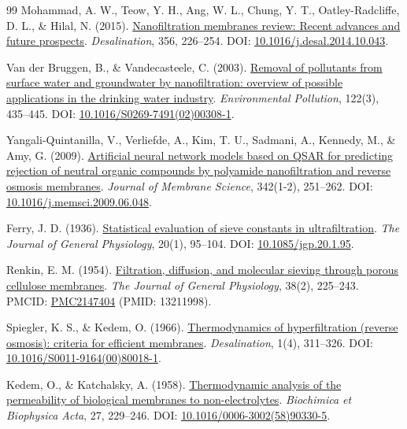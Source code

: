 \documentclass[11pt]{article}
\begin{document}
\begin{thebibliography}{99}
 Mohammad, A. W., Teow, Y. H., Ang, W. L., Chung, Y. T., Oatley-Radcliffe, D. L., \& Hilal, N. (2015). \href{https://doi.org/10.1016/j.desal.2014.10.043}{Nanofiltration membranes review: Recent advances and future prospects}. \textit{Desalination}, 356, 226--254. DOI: \href{https://doi.org/10.1016/j.desal.2014.10.043}{10.1016/j.desal.2014.10.043}.

 Van der Bruggen, B., \& Vandecasteele, C. (2003). \href{https://doi.org/10.1016/S0269-7491(02)00308-1}{Removal of pollutants from surface water and groundwater by nanofiltration: overview of possible applications in the drinking water industry}. \textit{Environmental Pollution}, 122(3), 435--445. DOI: \href{https://doi.org/10.1016/S0269-7491(02)00308-1}{10.1016/S0269-7491(02)00308-1}.

 Yangali-Quintanilla, V., Verliefde, A., Kim, T. U., Sadmani, A., Kennedy, M., \& Amy, G. (2009). \href{https://doi.org/10.1016/j.memsci.2009.06.048}{Artificial neural network models based on QSAR for predicting rejection of neutral organic compounds by polyamide nanofiltration and reverse osmosis membranes}. \textit{Journal of Membrane Science}, 342(1-2), 251--262. DOI: \href{https://doi.org/10.1016/j.memsci.2009.06.048}{10.1016/j.memsci.2009.06.048}.

 Ferry, J. D. (1936). \href{https://doi.org/10.1085/jgp.20.1.95}{Statistical evaluation of sieve constants in ultrafiltration}. \textit{The Journal of General Physiology}, 20(1), 95--104. DOI: \href{https://doi.org/10.1085/jgp.20.1.95}{10.1085/jgp.20.1.95}.

 Renkin, E. M. (1954). \href{https://pmc.ncbi.nlm.nih.gov/articles/PMC2147404/}{Filtration, diffusion, and molecular sieving through porous cellulose membranes}. \textit{The Journal of General Physiology}, 38(2), 225--243. PMCID: \href{https://pmc.ncbi.nlm.nih.gov/articles/PMC2147404/}{PMC2147404} (PMID: 13211998).

 Spiegler, K. S., \& Kedem, O. (1966). \href{https://doi.org/10.1016/S0011-9164(00)80018-1}{Thermodynamics of hyperfiltration (reverse osmosis): criteria for efficient membranes}. \textit{Desalination}, 1(4), 311--326. DOI: \href{https://doi.org/10.1016/S0011-9164(00)80018-1}{10.1016/S0011-9164(00)80018-1}.

 Kedem, O., \& Katchalsky, A. (1958). \href{https://doi.org/10.1016/0006-3002(58)90330-5}{Thermodynamic analysis of the permeability of biological membranes to non-electrolytes}. \textit{Biochimica et Biophysica Acta}, 27, 229--246. DOI: \href{https://doi.org/10.1016/0006-3002(58)90330-5}{10.1016/0006-3002(58)90330-5}.


\end{thebibliography}
\end{document}
